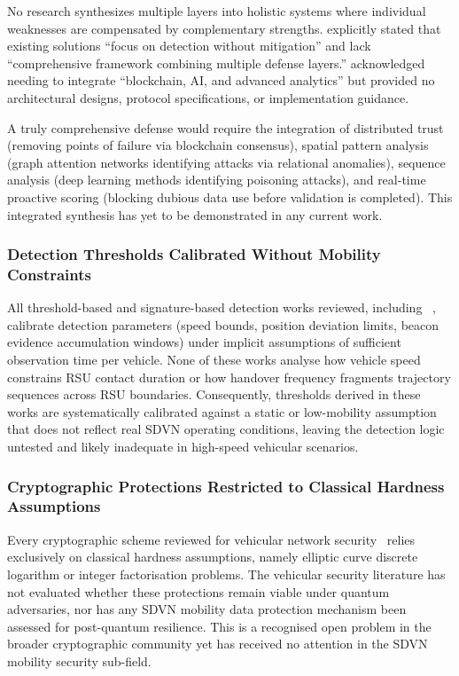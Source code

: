 \documentclass[12pt, a4paper]{report}
\begin{document}
No research synthesizes multiple layers into holistic systems where individual weaknesses are compensated by complementary strengths. \cite{bhatia2019} explicitly stated that existing solutions ``focus on detection without mitigation'' and lack ``comprehensive framework combining multiple defense layers.'' \cite{ravi2023} acknowledged needing to integrate ``blockchain, AI, and advanced analytics'' but provided no architectural designs, protocol specifications, or implementation guidance.

A truly comprehensive defense would require the integration of distributed trust (removing points of failure via blockchain consensus), spatial pattern analysis (graph attention networks identifying attacks via relational anomalies), sequence analysis (deep learning methods identifying poisoning attacks), and real-time proactive scoring (blocking dubious data use before validation is completed). This integrated synthesis has yet to be demonstrated in any current work.

\subsubsection{Detection Thresholds Calibrated Without Mobility Constraints}
\label{subsec:thresholds-no-mobility}

All threshold-based and signature-based detection works reviewed, including ~\cite{ghaleb2014}, calibrate detection parameters
(speed bounds, position deviation limits, beacon evidence accumulation windows)
under implicit assumptions of sufficient observation time per vehicle. None
of these works analyse how vehicle speed constrains RSU contact duration or
how handover frequency fragments trajectory sequences across RSU boundaries.
Consequently, thresholds derived in these works are systematically calibrated
against a static or low-mobility assumption that does not reflect real SDVN
operating conditions, leaving the detection logic untested and likely
inadequate in high-speed vehicular scenarios.

\subsubsection{Cryptographic Protections Restricted to Classical Hardness Assumptions}
\label{subsec:classical-hardness}

Every cryptographic scheme reviewed for vehicular network
security~\cite{faleh2025csasv,zhong2022broadcast, ahmed2022blockchain,
raja2021} relies exclusively on classical hardness assumptions, namely
elliptic curve discrete logarithm or integer factorisation problems. The
vehicular security literature has not evaluated whether these protections
remain viable under quantum adversaries, nor has any SDVN mobility data
protection mechanism been assessed for post-quantum resilience. This is
a recognised open problem in the broader cryptographic community yet has
received no attention in the SDVN mobility security sub-field.
\end{document}
